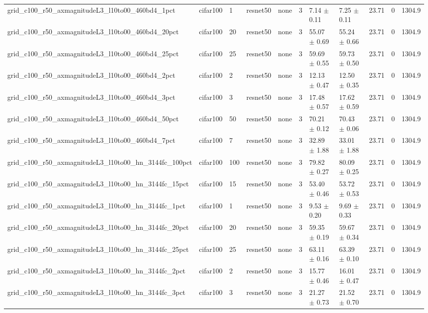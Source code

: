 \begin{tabular}{lllllllllll}
grid_c100_r50_axmagnitudeL3_l10to00_460bd4_1pct & cifar100 & 1 & resnet50 & none & 3 & 7.14 $\pm$ 0.11 & 7.25 $\pm$ 0.11 & 23.71 & 0 & 1304.9 \\
grid_c100_r50_axmagnitudeL3_l10to00_460bd4_20pct & cifar100 & 20 & resnet50 & none & 3 & 55.07 $\pm$ 0.69 & 55.24 $\pm$ 0.66 & 23.71 & 0 & 1304.9 \\
grid_c100_r50_axmagnitudeL3_l10to00_460bd4_25pct & cifar100 & 25 & resnet50 & none & 3 & 59.69 $\pm$ 0.55 & 59.73 $\pm$ 0.50 & 23.71 & 0 & 1304.9 \\
grid_c100_r50_axmagnitudeL3_l10to00_460bd4_2pct & cifar100 & 2 & resnet50 & none & 3 & 12.13 $\pm$ 0.47 & 12.50 $\pm$ 0.35 & 23.71 & 0 & 1304.9 \\
grid_c100_r50_axmagnitudeL3_l10to00_460bd4_3pct & cifar100 & 3 & resnet50 & none & 3 & 17.48 $\pm$ 0.57 & 17.62 $\pm$ 0.59 & 23.71 & 0 & 1304.9 \\
grid_c100_r50_axmagnitudeL3_l10to00_460bd4_50pct & cifar100 & 50 & resnet50 & none & 3 & 70.21 $\pm$ 0.12 & 70.43 $\pm$ 0.06 & 23.71 & 0 & 1304.9 \\
grid_c100_r50_axmagnitudeL3_l10to00_460bd4_7pct & cifar100 & 7 & resnet50 & none & 3 & 32.89 $\pm$ 1.88 & 33.01 $\pm$ 1.88 & 23.71 & 0 & 1304.9 \\
grid_c100_r50_axmagnitudeL3_l10to00_hn_3144fc_100pct & cifar100 & 100 & resnet50 & none & 3 & 79.82 $\pm$ 0.27 & 80.09 $\pm$ 0.25 & 23.71 & 0 & 1304.9 \\
grid_c100_r50_axmagnitudeL3_l10to00_hn_3144fc_15pct & cifar100 & 15 & resnet50 & none & 3 & 53.40 $\pm$ 0.46 & 53.72 $\pm$ 0.53 & 23.71 & 0 & 1304.9 \\
grid_c100_r50_axmagnitudeL3_l10to00_hn_3144fc_1pct & cifar100 & 1 & resnet50 & none & 3 & 9.53 $\pm$ 0.20 & 9.69 $\pm$ 0.33 & 23.71 & 0 & 1304.9 \\
grid_c100_r50_axmagnitudeL3_l10to00_hn_3144fc_20pct & cifar100 & 20 & resnet50 & none & 3 & 59.35 $\pm$ 0.19 & 59.67 $\pm$ 0.34 & 23.71 & 0 & 1304.9 \\
grid_c100_r50_axmagnitudeL3_l10to00_hn_3144fc_25pct & cifar100 & 25 & resnet50 & none & 3 & 63.11 $\pm$ 0.16 & 63.39 $\pm$ 0.10 & 23.71 & 0 & 1304.9 \\
grid_c100_r50_axmagnitudeL3_l10to00_hn_3144fc_2pct & cifar100 & 2 & resnet50 & none & 3 & 15.77 $\pm$ 0.46 & 16.01 $\pm$ 0.47 & 23.71 & 0 & 1304.9 \\
grid_c100_r50_axmagnitudeL3_l10to00_hn_3144fc_3pct & cifar100 & 3 & resnet50 & none & 3 & 21.27 $\pm$ 0.73 & 21.52 $\pm$ 0.70 & 23.71 & 0 & 1304.9 \\

\end{tabular}
